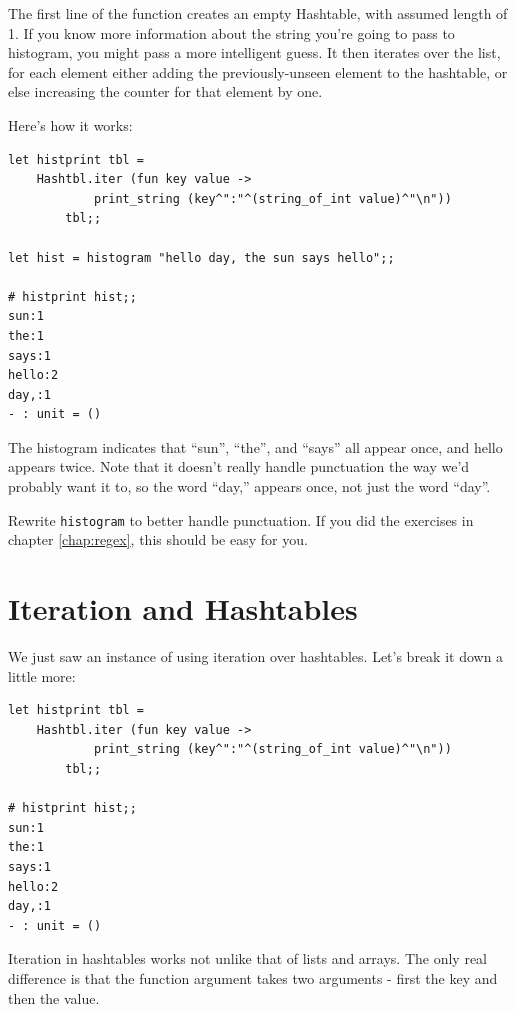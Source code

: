 \documentclass[10pt]{book}
\begin{document}
{

The first line of the function creates an empty Hashtable, with assumed 
length of 1. If you know more information about the string you're going 
to pass to histogram, you might pass a more intelligent guess. It then 
iterates over the list, for each element either adding the previously-unseen
element to the hashtable, or else increasing the counter for that 
element by one.


Here's how it works:

\beforeverb
\begin{verbatim}
let histprint tbl = 
	Hashtbl.iter (fun key value ->
			print_string (key^":"^(string_of_int value)^"\n"))
		tbl;;
		
let hist = histogram "hello day, the sun says hello";;

# histprint hist;;
sun:1
the:1
says:1
hello:2
day,:1
- : unit = ()
\end{verbatim}
\afterverb
%
The histogram indicates that ``sun'', ``the'', and ``says'' all appear once, and hello appears twice. Note that it doesn't really handle punctuation the way we'd probably want it to, so the word ``day,'' appears once, not just the word ``day''.

\begin{ex}
Rewrite {\tt histogram} to better handle punctuation. If you did the exercises in chapter \ref{chap:regex}, this should be easy for you.
\end{ex}

\section{Iteration and Hashtables}


We just saw an instance of using iteration over hashtables. Let's break it down a little more:

\beforeverb
\begin{verbatim}
let histprint tbl = 
	Hashtbl.iter (fun key value ->
			print_string (key^":"^(string_of_int value)^"\n"))
		tbl;;

# histprint hist;;
sun:1
the:1
says:1
hello:2
day,:1
- : unit = ()
\end{verbatim}
\afterverb

Iteration in hashtables works not unlike that of lists and arrays.
The only real difference is that the function argument takes two 
arguments - first the key and then the value.

}
\end{document}
